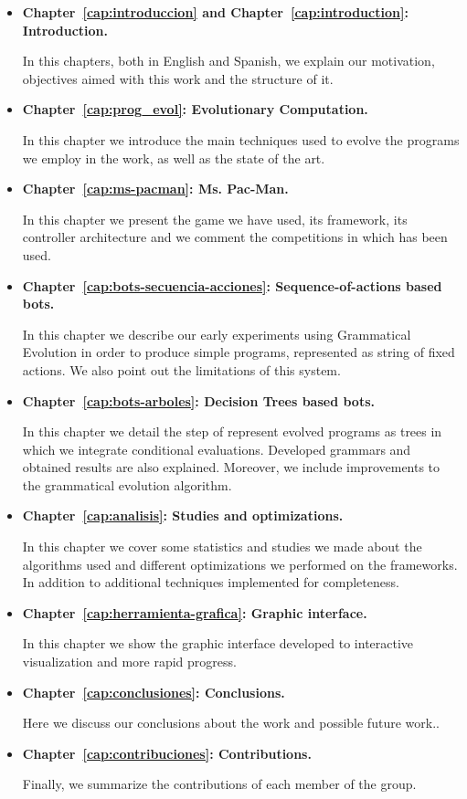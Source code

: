 \begin{itemize}
\item \textbf{Chapter~\ref{cap:introduccion} and Chapter~\ref{cap:introduction}: Introduction.}

In this chapters, both in English and Spanish, we explain our motivation, objectives aimed with this work and the structure of it.

\item \textbf{Chapter~\ref{cap:prog_evol}: Evolutionary Computation.}

In this chapter we introduce the main techniques used to evolve the programs we employ in the work, as well as the state of the art.

\item \textbf{Chapter~\ref{cap:ms-pacman}: Ms. Pac-Man.}

In this chapter we present the game we have used, its framework, its controller architecture and we comment the competitions in which has been used.

\item \textbf{Chapter~\ref{cap:bots-secuencia-acciones}: Sequence-of-actions based bots.}

In this chapter we describe our early experiments using Grammatical Evolution in order to produce simple programs, represented as string of fixed actions. We also point out the limitations of this system.

\item \textbf{Chapter~\ref{cap:bots-arboles}: Decision Trees based bots.}

In this chapter we detail the step of represent evolved programs as trees in which we integrate conditional evaluations. Developed grammars and obtained results are also explained. Moreover, we include improvements to the grammatical evolution algorithm.

\item \textbf{Chapter~\ref{cap:analisis}: Studies and optimizations.}

In this chapter we cover some statistics and studies we made about the algorithms used and different optimizations we performed on the frameworks. In addition to additional techniques implemented for completeness.

\item \textbf{Chapter~\ref{cap:herramienta-grafica}: Graphic interface.}

In this chapter we show the graphic interface developed to interactive visualization and more rapid progress.

\item \textbf{Chapter~\ref{cap:conclusiones}: Conclusions.}

Here we discuss our conclusions about the work and possible future work.. 

\item \textbf{Chapter~\ref{cap:contribuciones}: Contributions.}

Finally, we summarize the contributions of each member of the group.

\end{itemize}
